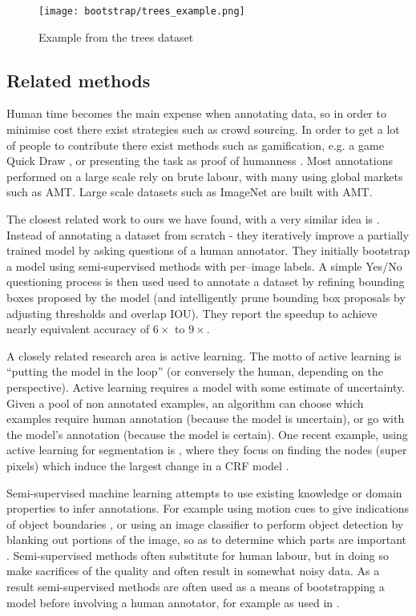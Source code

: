 \begin{figure}[ht]
\centering
\texttt{[image: bootstrap/trees\_example.png]}

\caption{Example from the trees dataset}
\label{fig:bootstrap_tree}
\end{figure}

\subsection{Related methods}


Human time becomes the main expense when annotating data, so in order to minimise cost there exist strategies such as crowd sourcing. In order to get a lot of people to contribute there exist methods such as gamification, e.g. a game Quick Draw \cite{Ha2017}, or presenting the task as proof of humanness \cite{Goodfellow2013a}.  Most annotations performed on a large scale rely on brute labour, with many using global markets such as \gls{AMT}. Large scale datasets such as ImageNet \cite{Russakovsky2015} are built with \gls{AMT}. 

The closest related work to ours we have found, with a very similar idea is \cite{Papadopoulos2016}. Instead of annotating a dataset from scratch - they iteratively improve a partially trained model by asking questions of a human annotator. They initially bootstrap a model using semi-supervised methods with per--image labels. A simple Yes/No questioning process is then used used to annotate a dataset by refining bounding boxes proposed by the model (and intelligently prune bounding box proposals by adjusting thresholds and overlap \gls{IOU}). They report the speedup to achieve nearly equivalent accuracy of $6\times$ to $9\times$.

A closely related research area is active learning. The motto of active learning is ``putting the model in the loop'' (or conversely the human, depending on the perspective). Active learning requires a model with some estimate of uncertainty. Given a pool of non annotated examples, an algorithm can choose which examples require human annotation (because the model is uncertain), or go with the model's annotation (because the model is certain). One recent example, using active learning for segmentation is \cite{Xu2017}, where they focus on finding the nodes (super pixels) which induce the largest change in a \gls{CRF} model .

Semi-supervised machine learning attempts to use existing knowledge or domain properties to infer annotations. For example using motion cues to give indications of object boundaries \cite{Hong2017}, or using an image classifier to perform object detection by blanking out portions of the image, so as to determine which parts are important \cite{Bazzani2016}. Semi-supervised methods often substitute for human labour, but in doing so make sacrifices of the quality and often result in somewhat noisy data. As a result semi-supervised methods are often used as a means of bootstrapping a model before involving a human annotator, for example as used in \cite{Papadopoulos2016}.


